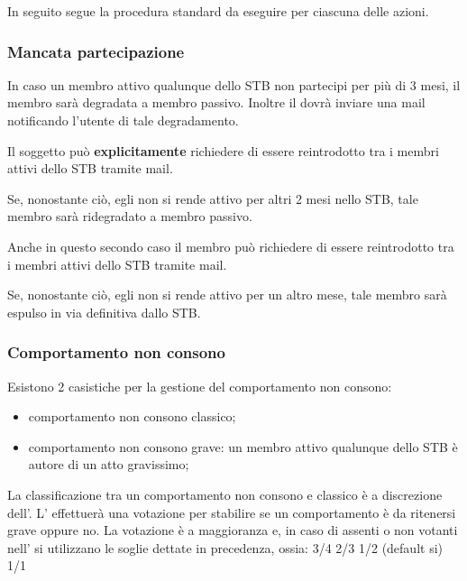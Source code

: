 In seguito segue la procedura standard da eseguire per ciascuna delle azioni.

\subsubsection{Mancata partecipazione}


In caso un membro attivo qualunque dello STB non partecipi per più di 3 mesi, il membro sarà degradata a membro passivo. Inoltre il  dovrà inviare una mail notificando l'utente di tale degradamento.

Il soggetto può \textbf{explicitamente} richiedere di essere reintrodotto tra i membri attivi dello STB tramite mail.

Se, nonostante ciò, egli non si rende attivo per altri 2 mesi nello STB, tale membro sarà ridegradato a membro passivo.

Anche in questo secondo caso il membro può richiedere di essere reintrodotto tra i membri attivi dello STB tramite mail.

Se, nonostante ciò, egli non si rende attivo per un altro mese, tale membro sarà espulso in via definitiva dallo STB.

\subsubsection{Comportamento non consono}


Esistono 2 casistiche per la gestione del comportamento non consono:

\begin{itemize}
	\item comportamento non consono classico;
	\item comportamento non consono grave: un membro attivo qualunque dello STB è autore di un atto gravissimo;
\end{itemize}

La classificazione tra un comportamento non consono e classico è a discrezione dell'\EC{}. L'\EC{} effettuerà una votazione per stabilire se un comportamento è da ritenersi grave oppure no. La votazione è a maggioranza e, in caso di assenti o non votanti nell'\EC{} si utilizzano le soglie dettate in precedenza, ossia:
3/4
2/3
1/2 (default si)
1/1

